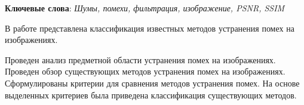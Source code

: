\begin{essay}{}
    \noindent\textbf{Ключевые слова}: \textit{Шумы, помехи, фильтрация, изображение, PSNR, SSIM}

В работе представлена классификация известных методов устранения помех на изображениях.

Проведен анализ предметной области устранения помех на изображениях. Проведен обзор существующих методов устранения помех на изображениях. Сформулированы критерии для сравнения методов устранения помех. На основе выделенных критериев была приведена классификация существующих методов.

\end{essay}

